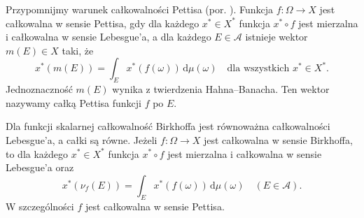 Przypomnijmy warunek całkowalności Pettisa
(por. ).
Funkcja $f:\Omega\to X$ jest całkowalna w sensie
Pettisa, gdy dla każdego $x^*\in X^*$ funkcja
$x^*\circ f$ jest mierzalna i całkowalna w sensie
Lebesgue'a, a dla każdego $E\in\mathcal A$ istnieje
wektor $m(E)\in X$ taki, że
\[
 x^*(m(E))=\int_E x^*(f(\omega))\,\mathrm d\mu(\omega)
 \quad\text{dla wszystkich }x^*\in X^*.
\]
Jednoznaczność $m(E)$ wynika z twierdzenia
Hahna--Banacha. Ten wektor nazywamy całką Pettisa
funkcji $f$ po $E$.

\begin{twierdzenie}
\label{thm:birkhoff-pettis-30}
Dla funkcji skalarnej całkowalność Birkhoffa jest
równoważna całkowalności Lebesgue'a, a całki są równe.
Jeżeli $f:\Omega\to X$ jest całkowalna w sensie Birkhoffa,
to dla każdego $x^*\in X^*$ funkcja $x^*\circ f$
jest mierzalna i całkowalna w sensie Lebesgue'a oraz
\[
 x^*(\nu_f(E))=\int_E x^*(f(\omega))\,\mathrm d\mu(\omega)
 \quad(E\in\mathcal A).
\]
W szczególności $f$ jest całkowalna w sensie Pettisa.
\end{twierdzenie}
